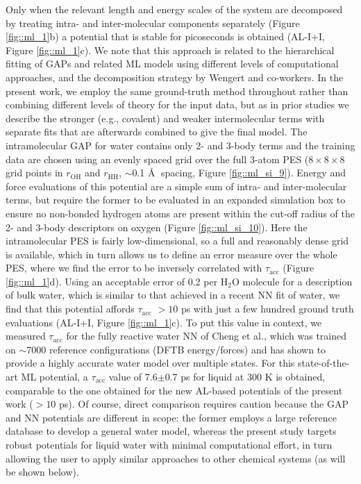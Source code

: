 \documentclass[../../main.tex]{subfiles}
\newcommand{\taua}{$\tau_\text{acc}$ }
\begin{document}
Only when the relevant length and energy scales of the system are decomposed by treating intra- and inter-molecular components separately (Figure \ref{fig::ml_1}b) a potential that is stable for picoseconds is obtained (AL-I+I, Figure \ref{fig::ml_1}c). We note that this approach is related to the hierarchical fitting of GAPs\cite{Veit2019, Bartok2013} and related ML models\cite{Dral2020, Ramakrishnan2015, Schran2020, Sukuba2018} using different levels of computational approaches, and the decomposition strategy by Wengert and co-workers.\cite{Wengert2021} In the present work, we employ the same ground-truth method throughout rather than combining different levels of theory for the input data, but as in prior studies we describe the stronger (e.g., covalent) and weaker intermolecular terms with separate fits that are afterwards combined to give the final model. The intramolecular GAP for water contains only 2- and 3-body terms and the training data are chosen using an evenly spaced grid over the full 3-atom PES ($8\times8\times8$ grid points in $r_\text{OH}$ and $r_\text{HH}$, $\sim$0.1 \AA$\;$ spacing, Figure \ref{fig::ml_si_9}). Energy and force evaluations of this potential are a simple sum of intra- and inter-molecular terms, but require the former to be evaluated in an expanded simulation box to ensure no non-bonded hydrogen atoms are present within the cut-off radius of the 2- and 3-body descriptors on oxygen (Figure \ref{fig::ml_si_10}). Here the intramolecular PES is fairly low-dimensional, so a full and reasonably dense grid is available, which in turn allows us to define an error measure over the whole PES, where we find the error to be inversely correlated with \taua (Figure \ref{fig::ml_1}d). Using an acceptable error of 0.2 \kcalx per H${}_2$O molecule for a description of bulk water, which is similar to that achieved in a recent NN fit of water,\cite{Cheng2019} we find that this potential affords \taua $>10$ ps with just a few hundred ground truth evaluations (AL-I+I, Figure \ref{fig::ml_1}c). To put this value in context, we measured \taua for the fully reactive water NN of Cheng et al.,\cite{Cheng2019} which was trained on $\sim$7000 reference configurations (DFTB energy/forces) and has shown to provide a highly accurate water model over multiple states. For this state-of-the-art ML potential, a \taua value of 7.6$\pm$0.7 ps for liquid at 300 K is obtained, comparable to the one obtained for the new AL-based potentials of the present work ($>10$ ps). Of course, direct comparison requires caution because the GAP and NN potentials are different in scope: the former employs a large reference database to develop a general water model, whereas the present study targets robust potentials for liquid water with minimal computational effort, in turn allowing the user to apply similar approaches to other chemical systems (as will be shown below). 
\end{document}
